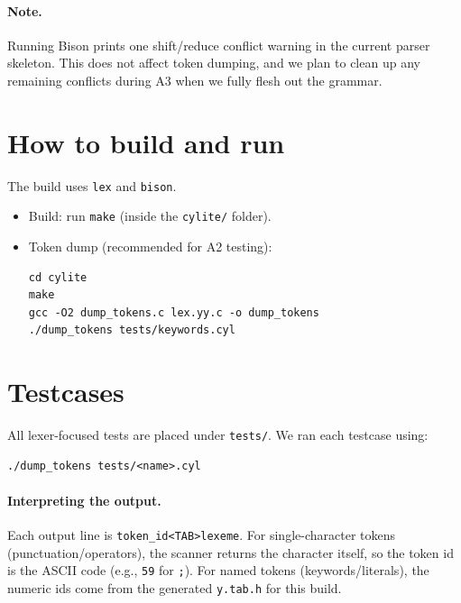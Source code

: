\documentclass[11pt]{article}
\begin{document}
\paragraph{Note.}
Running Bison prints one shift/reduce conflict warning in the current parser skeleton.
This does not affect token dumping, and we plan to clean up any remaining conflicts during A3 when we fully flesh out the grammar.

\section{How to build and run}
The build uses \texttt{lex} and \texttt{bison}.
\begin{itemize}
	\item Build: run \texttt{make} (inside the \texttt{cylite/} folder).
	\item Token dump (recommended for A2 testing):
	\begin{lstlisting}
cd cylite
make
gcc -O2 dump_tokens.c lex.yy.c -o dump_tokens
./dump_tokens tests/keywords.cyl
	\end{lstlisting}
\end{itemize}

\section{Testcases}
All lexer-focused tests are placed under \texttt{tests/}. We ran each testcase using:
\begin{lstlisting}
./dump_tokens tests/<name>.cyl
\end{lstlisting}

\paragraph{Interpreting the output.}
Each output line is \texttt{token\_id<TAB>lexeme}. For single-character tokens (punctuation/operators), the scanner returns the character itself, so the token id is the ASCII code (e.g., \texttt{59} for \texttt{;}). For named tokens (keywords/literals), the numeric ids come from the generated \texttt{y.tab.h} for this build.
\end{document}
